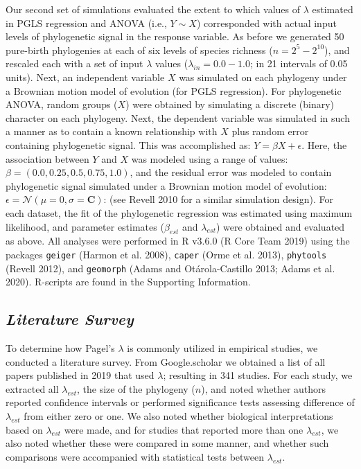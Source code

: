 \documentclass[
]{article}
\begin{document}
Our second set of simulations evaluated the extent to which values of
\(\lambda\) estimated in PGLS regression and ANOVA (i.e., \(Y\sim{X}\))
corresponded with actual input levels of phylogenetic signal in the
response variable. As before we generated 50 pure-birth phylogenies at
each of six levels of species richness (\(n=2^5 - 2^{10}\)), and
rescaled each with a set of input \(\lambda\) values
(\(\lambda_{in} = 0.0 - 1.0\); in 21 intervals of 0.05 units). Next, an
independent variable \(X\) was simulated on each phylogeny under a
Brownian motion model of evolution (for PGLS regression). For
phylogenetic ANOVA, random groups (\(X\)) were obtained by simulating a
discrete (binary) character on each phylogeny. Next, the dependent
variable was simulated in such a manner as to contain a known
relationship with \(X\) plus random error containing phylogenetic
signal. This was accomplished as: \(Y=\beta{X}+\epsilon\). Here, the
association between \(Y\) and \(X\) was modeled using a range of values:
\(\beta=(0.0,0.25, 0.5, 0.75,1.0)\), and the residual error was modeled
to contain phylogenetic signal simulated under a Brownian motion model
of evolution: \(\epsilon=\mathcal{N}(\mu=0,\sigma=\mathbf{C})\): (see
Revell 2010 for a similar simulation design). For each dataset, the fit
of the phylogenetic regression was estimated using maximum likelihood,
and parameter estimates (\(\beta_{est}\) and \(\lambda_{est}\)) were
obtained and evaluated as above. All analyses were performed in R v3.6.0
(R Core Team 2019) using the packages \texttt{geiger} (Harmon et al.
2008), \texttt{caper} (Orme et al. 2013), \texttt{phytools} (Revell
2012), and \texttt{geomorph} (Adams and Otárola-Castillo 2013; Adams et
al. 2020). R-scripts are found in the Supporting Information.

\hypertarget{literature-survey}{%
\subsection{\texorpdfstring{\emph{Literature
Survey}}{Literature Survey}}\label{literature-survey}}

To determine how Pagel's \(\lambda\) is commonly utilized in empirical
studies, we conducted a literature survey. From Google.scholar we
obtained a list of all papers published in 2019 that used \(\lambda\);
resulting in 341 studies. For each study, we extracted all
\(\lambda_{est}\), the size of the phylogeny (\(n\)), and noted whether
authors reported confidence intervals or performed significance tests
assessing difference of \(\lambda_{est}\) from either zero or one. We
also noted whether biological interpretations based on \(\lambda_{est}\)
were made, and for studies that reported more than one
\(\lambda_{est}\), we also noted whether these were compared in some
manner, and whether such comparisons were accompanied with statistical
tests between \(\lambda_{est}\).
\end{document}
